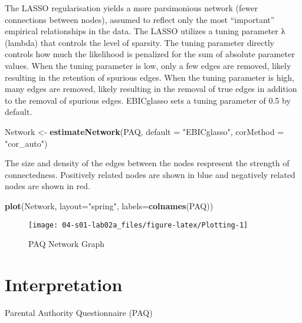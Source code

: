 \documentclass[]{book}
\newenvironment{Shaded}{\begin{snugshade}}{\end{snugshade}}
\newcommand{\DataTypeTok}[1]{\textcolor[rgb]{0.13,0.29,0.53}{#1}}
\newcommand{\KeywordTok}[1]{\textcolor[rgb]{0.13,0.29,0.53}{\textbf{#1}}}
\newcommand{\NormalTok}[1]{#1}
\newcommand{\StringTok}[1]{\textcolor[rgb]{0.31,0.60,0.02}{#1}}
\begin{document}
The LASSO regularisation yields a more parsimonious network (fewer connections between nodes), assumed to reflect only the most ``important'' empirical relationships in the data. The LASSO utilizes a tuning parameter λ (lambda) that controls the level of sparsity. The tuning parameter directly controls how much the likelihood is penalized for the sum of absolute parameter values. When the tuning parameter is low, only a few edges are removed, likely resulting in the retention of spurious edges. When the tuning parameter is high, many edges are removed, likely resulting in the removal of true edges in addition to the removal of spurious edges. EBICglasso sets a tuning parameter of 0.5 by default.

\begin{Shaded}
\begin{Highlighting}[]
\NormalTok{Network <-}\StringTok{ }\KeywordTok{estimateNetwork}\NormalTok{(PAQ, }\DataTypeTok{default =} \StringTok{"EBICglasso"}\NormalTok{, }\DataTypeTok{corMethod =} \StringTok{"cor_auto"}\NormalTok{)}
\end{Highlighting}
\end{Shaded}

The size and density of the edges between the nodes respresent the strength of connectedness. Positively related nodes are shown in { blue} and negatively related nodes are shown in {red}.

\begin{Shaded}
\begin{Highlighting}[]
\KeywordTok{plot}\NormalTok{(Network, }\DataTypeTok{layout=}\StringTok{"spring"}\NormalTok{, }\DataTypeTok{labels=}\KeywordTok{colnames}\NormalTok{(PAQ))}
\end{Highlighting}
\end{Shaded}

\begin{figure}

{\centering \texttt{[image: 04-s01-lab02a\_files/figure-latex/Plotting-1]} 

}

\caption{PAQ Network Graph}\label{fig:Plotting}
\end{figure}

\hypertarget{interpretation}{%
\section{Interpretation}\label{interpretation}}

{Parental Authority Questionnaire (PAQ)}
\end{document}
